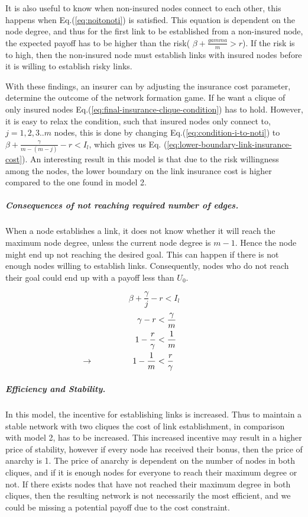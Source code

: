 It is also useful to know when non-insured nodes connect to each other, this happens when Eq.(\ref{eq:noitonoti}) is satisfied. This equation is dependent on the node degree, and thus for the first link to be established from a non-insured node, the expected payoff has to be higher than the risk( $\beta+\frac{gamma}{m}>r$). If the risk is to high, then the non-insured node must establish links with insured nodes before it is willing to establish risky links.

With these findings, an insurer can by adjusting the insurance cost parameter, determine the outcome of the network formation game.
If he want a clique of only insured nodes Eq.(\ref{eq:final-insurance-clique-condition}) has to
hold. However, it is easy to relax the condition, such that insured nodes only connect to, $j=1,2,3..m$ nodes,
   this is done by changing Eq.(\ref{eq:condition-i-to-noti}) to $\beta+\frac{\gamma}{m-(m-j)}-r<I_{l}$, which
    gives us Eq. (\ref{eq:lower-boundary-link-insurance-cost}).
An interesting result in this model is that due to the risk willingness among the nodes, the lower boundary on the link insurance cost is higher compared to the one found in model 2. 

\subparagraph{Consequences of not reaching required number of edges.} When a node establishes a link, it does not know whether it will reach the maximum node degree, unless the current node degree is $m-1$. Hence the node might end up not reaching the desired goal. This can happen if there is not enough nodes willing to establish links. Consequently, nodes who do not reach their goal could end up with a payoff less than $U_{0}$. 

\begin{equation} 
\beta+\frac{\gamma}{j}-r<I_{l}
\label{eq:lower-boundary-link-insurance-cost}
\end{equation} 
\begin{eqnarray}
\gamma-r &<\frac{\gamma}{m}\nonumber \\
1-\frac{r}{\gamma}&<\frac{1}{m} \nonumber \\
\llap{$\rightarrow$\hspace{50pt}}1-\frac{1}{m}&<\frac{r}{\gamma}
\label{eq:noinsuredcliqueconditon}
\end{eqnarray}


\subparagraph{Efficiency and Stability.}

In this model, the incentive for establishing links is increased. Thus to maintain a stable network with two cliques the cost of link establishment, in comparison with model 2, has to be increased. This increased incentive may result in a higher price of stability, however if every node has received their bonus, then the price of anarchy is 1. The price of anarchy is dependent on the number of nodes in both cliques, and if it is enough nodes for everyone to reach their maximum degree or not. 
If there exists nodes that have not reached their maximum degree in both cliques, then the resulting network is not necessarily the most efficient, and we could be missing a potential payoff due to the cost constraint. 

